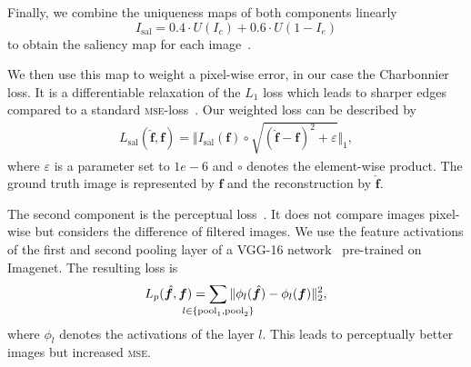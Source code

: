 \documentclass{scrartcl}
\newcommand{\img}{\bm{f}} %
\begin{document}
Finally, we combine the uniqueness maps of both components linearly
\begin{equation}
  \label{eq:saliency}
  I_{\text{sal}} = 0.4 \cdot U(I_c) + 0.6 \cdot U(1 - I_e)
\end{equation}
to obtain the saliency map for each image~\cite{SaliencyGAN}.

We then use this map to weight a pixel-wise error, in our case the Charbonnier loss.
It is a differentiable relaxation of the $L_1$ loss which leads to sharper edges compared to a standard \textsc{mse}-loss~\cite{LapSRN}.
Our weighted loss can be described by
\begin{align}
\label{eq:charbonnier}
  L_{\text{sal}}( \hat{\bm{\img}}, \bm{\img}) = \Vert I_{\text{sal}}(\img) \circ \sqrt{ (\hat{\img} - \img)^2 + \varepsilon} \Vert_1,
\end{align}
where $\varepsilon$ is a parameter set to $1e-6$ and \(\circ\) denotes the element-wise product.
The ground truth image is represented by $\img$ and the reconstruction by $\hat{\img}$.

The second component is the perceptual loss~\cite{PerceptualLoss}.
It does not compare images pixel-wise but considers the difference of filtered images.
We use the feature activations of the first and second pooling layer of a VGG-16 network~\cite{Vgg} pre-trained on Imagenet.
The resulting loss is
\begin{equation}
  \label{eq:perceptual-loss}
  L_p(\hat{\img}, \img) = \sum_{\mathclap{l \in \{ \text{pool}_1, \text{pool}_2 \}}} \Vert \phi_l( \hat{\img} ) - \phi_l (\img) \Vert_2^2,
\end{equation}
where \(\phi_l\) denotes the activations of the layer \(l\).
This leads to perceptually better images but increased \textsc{mse}.
\end{document}
